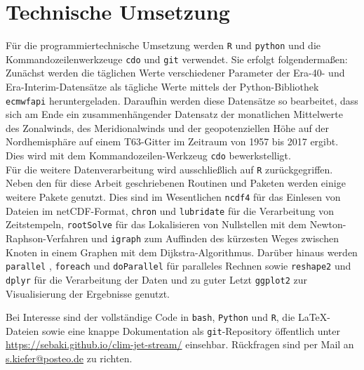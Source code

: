 \section{Technische Umsetzung}
Für die programmiertechnische Umsetzung werden \texttt{R} und \texttt{python} und die Kommando\-zeilen\-werkzeuge \texttt{cdo} und \texttt{git} verwendet. Sie erfolgt folgendermaßen: 
\\
Zunächst werden die täglichen Werte verschiedener Parameter der Era-40- und Era-Interim-Datensätze als tägliche Werte mittels der Python-Bibliothek \texttt{ecmwfapi} \citep{ecmwfapi} heruntergeladen. Daraufhin werden diese Datensätze so bearbeitet, dass sich am Ende ein zusammenhängender Datensatz der monatlichen Mittelwerte des Zonalwinds, des Meridionalwinds und der geopotenziellen Höhe auf der Nordhemisphäre auf einem T63-Gitter im Zeitraum von 1957 bis 2017 ergibt. Dies wird mit dem Kommandozeilen-Werkzeug \texttt{cdo} \citep{cdo-2015} bewerkstelligt.
\\
Für die weitere Datenverarbeitung wird ausschließlich auf \texttt{R} \citep{R-2017} zurückgegriffen. Neben den für diese Arbeit geschriebenen Routinen und Paketen werden einige weitere Pakete genutzt. Dies sind im Wesentlichen \texttt{ncdf4} \citep{ncdf4-2017} für das Einlesen von Dateien im netCDF-Format, \texttt{chron} \citep{chron-2017} und \texttt{lubridate} \citep{lubridate-2011} für die Verarbeitung von Zeitstempeln, \texttt{rootSolve} \citep{rootSolve-2009} für das Lokalisieren von Nullstellen mit dem Newton-Raphson-Verfahren und \texttt{igraph} \citep{igraph-2006} zum Auffinden des kürzesten Weges zwischen Knoten in einem Graphen mit dem Dijkstra-Algorithmus.
Darüber hinaus werden \texttt{parallel} \citep{R-2017}, \texttt{foreach} \citep{foreach-2015} und \texttt{doParallel} \citep{doParallel-2015} für paralleles Rechnen sowie \texttt{reshape2} \citep{reshape2-2007} und \texttt{dplyr} \citep{dplyr} für die Verarbeitung der Daten und zu guter Letzt \texttt{ggplot2} \citep{ggplot2-2009} zur Visualisierung der Ergebnisse genutzt.

Bei Interesse sind der vollständige Code in \texttt{bash}, \texttt{Python} und \texttt{R}, die \LaTeX-Dateien sowie eine knappe Dokumentation als \texttt{git}-Repository öffentlich unter \url{https://sebaki.github.io/clim-jet-stream/} einsehbar. Rückfragen sind per Mail an {\url{s.kiefer@posteo.de}} zu richten.

